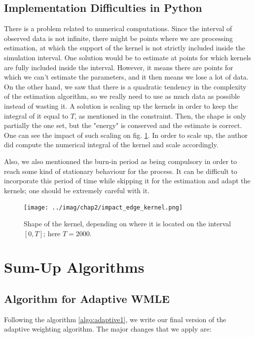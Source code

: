 \documentclass[11pt]{book}
\begin{document}
\subsection{Implementation Difficulties in Python}

There is a problem related to numerical computations. Since the interval of observed data is not infinite, there might be points where we are processing estimation, at which the support of the kernel is not strictly included inside the simulation interval. One solution would be to estimate at points for which kernels are fully included inside the interval. However, it means there are points for which we can't estimate the parameters, and it then means we lose a lot of data. On the other hand, we saw that there is a quadratic tendency in the complexity of the estimation algorithm, so we really need to use as much data as possible instead of wasting it. A solution is scaling up the kernels in order to keep the integral of it equal to $T$, as mentioned in the constraint. Then, the shape is only partially the one set, but the "energy" is conserved and the estimate is correct. One can see the impact of such scaling on fig. \ref{fig:scaling_kernels}. In order to scale up, the author did compute the numerical integral of the kernel and scale accordingly.

Also, we also mentionned the burn-in period as being compulsory in order to reach some kind of stationary behaviour for the process. It can be difficult to incorporate this period of time while skipping it for the estimation and adapt the kernels; one should be extremely careful with it.
\begin{figure}
\centering
\texttt{[image: ../imag/chap2/impact\_edge\_kernel.png]}
\caption{Shape of the kernel, depending on where it is located on the interval $[0,T]$; here $T = 2000$.}
\label{fig:scaling_kernels}
\end{figure}



\section{Sum-Up Algorithms}
\subsection{Algorithm for Adaptive WMLE}
Following the algorithm \ref{algo:adaptive1}, we write our final version of the adaptive weighting algorithm. The major changes that we apply are:
\end{document}
